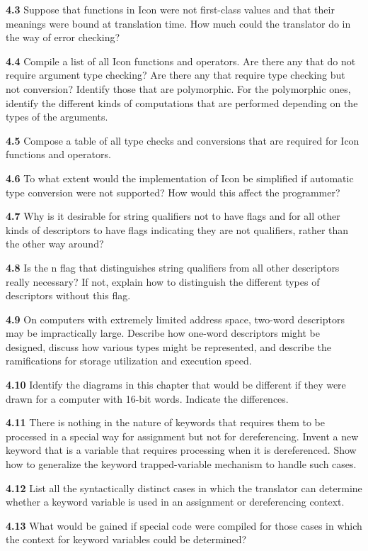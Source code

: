 \noindent\textbf{4.3} Suppose that functions in Icon were not
first-class values and that their meanings were bound at translation
time. How much could the translator do in the way of error checking?

\noindent\textbf{4.4} Compile a list of all Icon functions and
operators. Are there any that do not require argument type checking?
Are there any that require type checking but not conversion? Identify
those that are polymorphic. For the polymorphic ones, identify the
different kinds of computations that are performed depending on the
types of the arguments.

\noindent\textbf{4.5} Compose a table of all type checks and
conversions that are required for Icon functions and operators.

\noindent\textbf{4.6} To what extent would the implementation of Icon
be simplified if automatic type conversion were not supported? How
would this affect the programmer?

\noindent\textbf{4.7} Why is it desirable for string qualifiers not to have
flags and for all other kinds of descriptors to have flags indicating they
are not qualifiers, rather than the other way around?

\noindent\textbf{4.8} Is the n flag that distinguishes string qualifiers
from all other descriptors really necessary? If not, explain how to
distinguish the different types of descriptors without this flag.

\noindent\textbf{4.9} On computers with extremely limited address
space, two-word descriptors may be impractically large. Describe how
one-word descriptors might be designed, discuss how various types
might be represented, and describe the ramifications for storage
utilization and execution speed.

\noindent\textbf{4.10} Identify the diagrams in this chapter that
would be different if they were drawn for a computer with 16-bit
words.  Indicate the differences.

\noindent\textbf{4.11} There is nothing in the nature of keywords that
requires them to be processed in a special way for assignment but not
for dereferencing. Invent a new keyword that is a variable that
requires processing when it is dereferenced. Show how to generalize
the keyword trapped-variable mechanism to handle such cases.

\noindent\textbf{4.12} List all the syntactically distinct cases in which the
translator can determine whether a keyword variable is used in an
assignment or dereferencing context.

\noindent\textbf{4.13} What would be gained if special code were compiled for
those cases in which the context for keyword variables could be determined?
